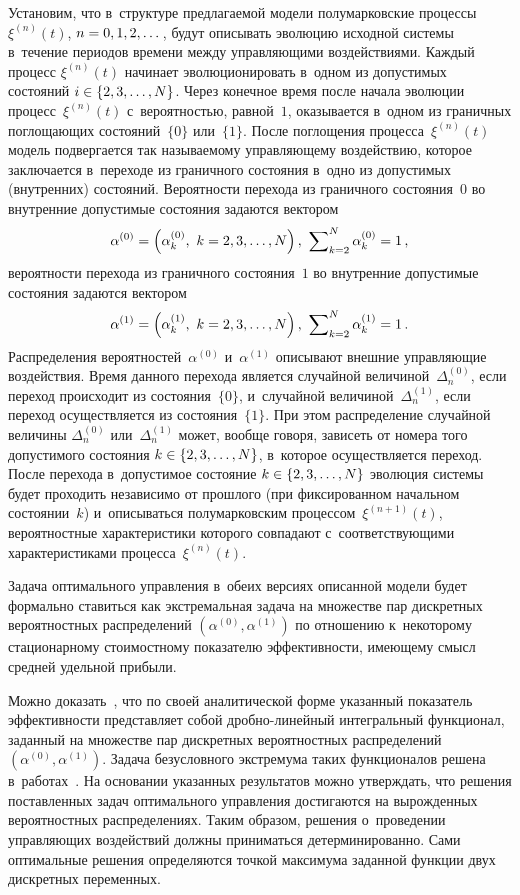 \begin{multicols}{2}
Установим, что в~структуре предлагаемой модели полумарковские процессы  
$\xi^{(n)}(t)$, $n\hm=0,1,2,\dots$, будут описывать эволюцию исходной системы 
в~течение периодов времени между управляющими воздействиями. Каждый процесс 
$\xi^{(n)}(t)$ начинает эволюционировать в~одном из допустимых состояний  
$i\hm\in\{2,3,\ldots,N\}$.
Через конечное время после начала эволюции процесс~$\xi^{(n)}(t)$ 
с~вероятностью, равной~$1$, оказывается в~одном 
из граничных поглощающих состояний~$\{0\}$ или~$\{1\}$. 
После поглощения процесса~$\xi^{(n)}(t)$ модель 
подвергается так называемому управляющему воздействию, которое заключается 
в~переходе из граничного состояния в~одно из допустимых (внутренних) состояний. 
Вероятности перехода из граничного состояния~$0$ во внутренние допустимые 
состояния задаются вектором 
$$
\alpha^{(0)}\hm=\left(\alpha_k^{(0)},\ k=2,3,\dots,N\right),\
\sum\nolimits_{k=2}^N\alpha_k^{(0)}=1\,,$$
 вероятности перехода 
из граничного состояния~$1$ во внутренние 
допустимые состояния задаются вектором 
$$
\alpha^{(1)}=\left(\alpha_k^{(1)},\ k=2,3,\dots,N\right),\
\sum\nolimits_{k=2}^N\alpha_k^{(1)}\hm=1\,.
$$
 Распределения 
вероятностей~$\alpha^{(0)}$ и~$\alpha^{(1)}$ 
описывают внешние управляющие воздействия. Время данного перехода является 
случайной величиной~$\Delta_n^{(0)}$, если переход происходит из 
состояния~$\{0\}$, и~случайной величиной~$\Delta_n^{(1)}$, 
если переход осуществляется из 
состояния~$\{1\}$. При этом распределение случайной величины $\Delta_n^{(0)}$ 
или~$\Delta_n^{(1)}$ может, вообще говоря, зависеть от номера того допустимого 
состояния $k \hm\in \{2,3,\ldots,N\}$, в~которое осуществляется переход. После 
перехода в~допустимое состояние $k \hm\in \{2,3,\ldots,N\}$ эволюция системы будет 
проходить независимо от прошлого (при фиксированном начальном состоянии~$k$) 
и~описываться полумарковским процессом~$\xi^{(n+1)}(t)$, вероятностные 
характеристики которого совпадают с~соответствующими характеристиками процесса~$\xi^{(n)}(t)$.

Задача оптимального управления в~обеих версиях описанной модели будет формально 
ставиться как экстремальная задача на множестве пар дискретных вероятностных 
распределений $\left(\alpha^{(0)}, \alpha^{(1)}\right)$ по отношению 
к~некоторому стационарному стоимостному показателю эффективности, имеющему смысл 
средней удельной прибыли.

Можно доказать~\cite{SN1, SN29}, что по своей аналитической форме указанный 
показатель эффективности представляет собой дробно-линейный интегральный 
функционал, заданный на множестве пар дискретных вероятностных распределений 
$\left(\alpha^{(0)}, \alpha^{(1)}\right)$. Задача безусловного экстремума таких 
функционалов решена в~работах~\cite{SN26, qwe2}.
На основании указанных результатов можно утверждать, что решения поставленных 
задач оптимального управления достигаются на вырожденных вероятностных 
распределениях. Таким образом, решения о~проведении управ\-ля\-ющих воздействий 
должны приниматься детерминированно. Сами оптимальные решения определяются точкой максимума 
заданной функции двух дискретных переменных.


\end{multicols}
